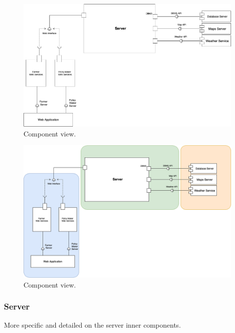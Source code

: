 \begin{figure}[H]
    \begin{center}
    \includegraphics[width=1\textwidth]{images/Component1.png}
    \caption{Component view.}
    \label{fig:component view}
    \end{center}
\end{figure}

\begin{figure}[H]
    \begin{center}
    \includegraphics[width=1\textwidth]{images/Component2.png}
    \caption{Component view.}
    \label{fig:component view2}
    \end{center}
\end{figure}

\subsubsection{Server}
More specific and detailed on the server inner components.

